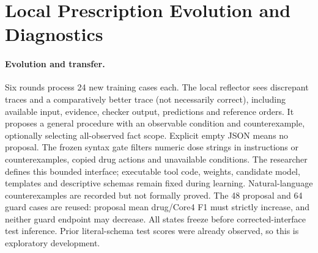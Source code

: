 \section{Local Prescription Evolution and Diagnostics}\label{app:local}
\paragraph{Evolution and transfer.}
Six rounds process 24 new training cases each. The local reflector sees discrepant traces and a comparatively better trace (not necessarily correct), including available input, evidence, checker output, predictions and reference orders. It proposes a general procedure with an observable condition and counterexample, optionally selecting all-observed fact scope. Explicit empty JSON means no proposal. The frozen syntax gate filters numeric dose strings in instructions or counterexamples, copied drug actions and unavailable conditions. The researcher defines this bounded interface; executable tool code, weights, candidate model, templates and descriptive schemas remain fixed during learning. Natural-language counterexamples are recorded but not formally proved. The 48 proposal and 64 guard cases are reused: proposal mean drug/Core4 F1 must strictly increase, and neither guard endpoint may decrease. All states freeze before corrected-interface test inference. Prior literal-schema test scores were already observed, so this is exploratory development.

